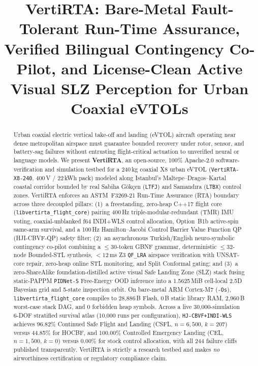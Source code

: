 \documentclass[conference,10pt]{IEEEtran}
\title{VertiRTA: Bare-Metal Fault-Tolerant Run-Time Assurance, Verified Bilingual Contingency Co-Pilot, and License-Clean Active Visual SLZ Perception for Urban Coaxial eVTOLs}
\author{\IEEEauthorblockN{VertiRTA Open-Source Contributors}
\IEEEauthorblockA{Maltepe--Dragos--Kartal Urban Air Mobility Research Testbed, Istanbul, T\"urkiye\\
Repository \& Artifacts: Apache-2.0 Open-Source Release \texttt{v2.0.0} (Baseline \texttt{v1.0.0} Commit \texttt{ef9be75})}}
\begin{document}
\maketitle

\begin{abstract}
Urban coaxial electric vertical take-off and landing (eVTOL) aircraft operating near dense metropolitan airspace must guarantee bounded recovery under rotor, sensor, and battery-sag failures without entrusting flight-critical actuation to unverified neural or language models. We present \textbf{VertiRTA}, an open-source, 100\% Apache-2.0 software-verification and simulation testbed for a 240\,kg coaxial X8 urban eVTOL (\texttt{VertiRTA-X8-240}, 400\,V / 22\,kWh pack) modeled along Istanbul's Maltepe--Dragos--Kartal coastal corridor bounded by real Sabiha G\"ok\c{c}en (\texttt{LTFJ}) and Samand\i ra (\texttt{LTBX}) control zones. VertiRTA enforces an ASTM~F3269-21 Run-Time Assurance (RTA) boundary across three decoupled pillars: (1)~a freestanding, zero-heap C++17 flight core (\texttt{libvertirta\_flight\_core}) pairing 400\,Hz triple-modular-redundant (TMR) IMU voting, coaxial-unblanked f64 INDI+WLS control allocation, Option~B1b active-spin same-arm survival, and a 100\,Hz Hamilton--Jacobi Control Barrier Value Function QP (HJI-CBVF-QP) safety filter; (2)~an asynchronous Turkish/English neuro-symbolic contingency co-pilot combining a $\le 30$-token GBNF grammar, deterministic $\le 32$-node Bounded-STL synthesis, $<12$\,ms Z3 \texttt{QF\_LRA} airspace verification with UNSAT-core repair, zero-heap online STL monitoring, and Split Conformal gating; and (3)~a zero-ShareAlike foundation-distilled active visual Safe Landing Zone (SLZ) stack fusing static-PAPPM \texttt{PIDNet-S} Free-Energy OOD inference into a 1.5625\,MiB cell-local 2.5D Bayesian grid and 5-state inspection orbit. On bare-metal ARM Cortex-M7 (\texttt{-Os}), \texttt{libvertirta\_flight\_core} compiles to 28{,}886\,B Flash, 0\,B static library RAM, 2{,}960\,B worst-case stack DAG, and 0 forbidden heap symbols. Across a live 30{,}000-simulation 6-DOF stratified survival atlas (10{,}000 runs per configuration), \texttt{HJ-CBVF+INDI-WLS} achieves 96.82\% Continued Safe Flight and Landing (CSFL, $n=6{,}500$, $k=207$) versus 44.85\% for HOCBF, and 100.00\% Controlled Emergency Landing (CEL, $n=1{,}500$, $k=0$) versus 0.00\% for stock control allocation, with all 244 failure cliffs published transparently. VertiRTA is strictly a research testbed and makes \emph{no} airworthiness certification or regulatory compliance claim.
\end{abstract}
\end{document}
